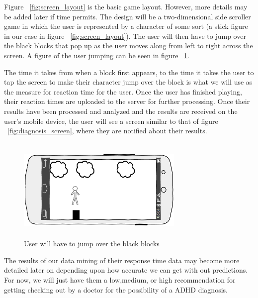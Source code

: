 \documentclass[a4wide]{article}
\begin{document}
Figure ~\ref{fig:screen_layout} is the basic game layout. However, more details may be added later if time permits. The design will be a two-dimensional side scroller game in which the user is represented by a character of some sort (a stick figure in our case in figure ~\ref{fig:screen_layout}). The user will then have to jump over the black blocks that pop up as the user moves along from left to right across the screen. A figure of the user jumping can be seen in figure ~\ref{fig:user_jumping}.



 The time it takes from when a block first appears, to the time it takes the user to tap the screen to make their character jump over the block is what we will use as the  measure for reaction time for the user. Once the user has finished playing, their reaction times are uploaded to the server for further processing. Once their results have been processed and analyzed and the results are received on the user's mobile device, the user will see a screen similar to that of figure ~\ref{fig:diagnosis_screen}, where they are notified about their results.

\begin{figure}[H]
\centering
\includegraphics[height=5cm, width = 8cm]{images/user_jumping.png}
\caption{User will have to jump over the black blocks}
\label{fig:user_jumping}
\end{figure}

The results of our data mining of their response time data may become more detailed later on depending upon how accurate we can get with out predictions. For now, we will just have them a low,medium, or high recommendation for getting checking out by a doctor for the possibility of a ADHD diagnosis.
\end{document}
